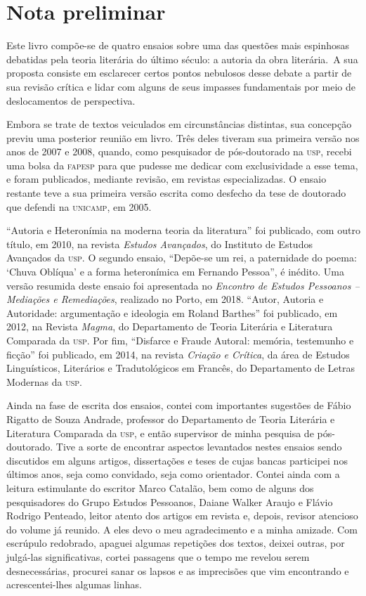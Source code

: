 \chapter*{Nota preliminar}

Este livro compõe-se de quatro ensaios sobre uma das questões mais espinhosas debatidas pela teoria literária do último século: a autoria da obra literária.~A sua proposta consiste em esclarecer certos pontos nebulosos desse debate a partir de sua revisão crítica e lidar com alguns de seus impasses fundamentais por meio de deslocamentos de perspectiva.

Embora se trate de textos veiculados em circunstâncias distintas, sua concepção previu uma posterior reunião em livro. Três deles tiveram sua primeira versão nos anos de 2007 e 2008, quando, como pesquisador de pós-doutorado na \textsc{usp}, recebi uma bolsa da \textsc{fapesp} para que pudesse me dedicar com exclusividade a esse tema, e foram publicados, mediante revisão, em revistas especializadas. O ensaio restante teve a sua primeira versão escrita como desfecho da tese de doutorado que defendi na \textsc{unicamp}, em 2005.

``Autoria e Heteronímia na moderna teoria da literatura'' foi publicado, com outro título, em 2010, na revista \emph{Estudos Avançados}, do Instituto de Estudos Avançados da \textsc{usp}. O segundo ensaio, ``Depõe-se um rei, a paternidade do poema: `Chuva Oblíqua' e a forma heteronímica em Fernando Pessoa'', é inédito. Uma versão resumida deste ensaio foi apresentada no \emph{Encontro de Estudos Pessoanos -- Mediações e Remediações}, realizado no Porto, em 2018.  ``Autor, Autoria e Autoridade: argumentação e ideologia em Roland Barthes'' foi publicado, em 2012, na Revista \emph{Magma}, do Departamento de Teoria Literária e Literatura Comparada da \textsc{usp}. Por fim, ``Disfarce e Fraude Autoral: memória, testemunho e ficção'' foi publicado, em 2014, na revista \emph{Criação e Crítica}, da área de Estudos Linguísticos, Literários e Tradutológicos em Francês, do Departamento de Letras Modernas da \textsc{usp}. 

Ainda na fase de escrita dos ensaios, contei com importantes sugestões de Fábio Rigatto de Souza Andrade, professor do Departamento de Teoria Literária e Literatura Comparada da \textsc{usp}, e então supervisor de minha pesquisa de pós-doutorado. Tive a sorte de encontrar aspectos levantados nestes ensaios sendo discutidos em alguns artigos, dissertações e teses de cujas bancas participei nos últimos anos, seja como convidado, seja como orientador. Contei ainda com a leitura estimulante do escritor Marco Catalão, bem como de alguns dos pesquisadores do Grupo Estudos Pessoanos, Daiane Walker Araujo e Flávio Rodrigo Penteado, leitor atento dos artigos em revista e, depois, revisor atencioso do volume já reunido. A eles devo o meu agradecimento e a minha amizade. Com escrúpulo redobrado, apaguei algumas repetições dos textos, deixei outras, por julgá-las significativas, cortei passagens que o tempo me revelou serem desnecessárias, procurei sanar os lapsos e as imprecisões que vim encontrando e acrescentei-lhes algumas linhas. 

